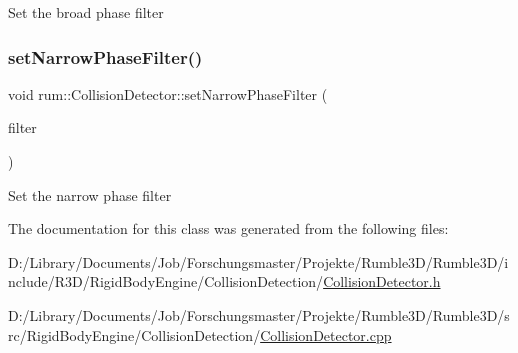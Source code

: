 Set the broad phase filter \mbox{\label{classrum_1_1_collision_detector_ae81fd3b892eb3a03520b6487ae91dedd}} 
\subsubsection{\texorpdfstring{set\+Narrow\+Phase\+Filter()}{setNarrowPhaseFilter()}}
{\footnotesize\ttfamily void rum\+::\+Collision\+Detector\+::set\+Narrow\+Phase\+Filter (\begin{DoxyParamCaption}\item[{\mbox{\hyperlink{classrum_1_1_collision_detector_a8a6d24fed38f8be11b25e43eaabc9638}{Narrow\+Phase\+Filter\+\_\+\+Ptr}}}]{filter }\end{DoxyParamCaption})}

Set the narrow phase filter 

The documentation for this class was generated from the following files\+:\begin{DoxyCompactItemize}
\item 
D\+:/\+Library/\+Documents/\+Job/\+Forschungsmaster/\+Projekte/\+Rumble3\+D/\+Rumble3\+D/include/\+R3\+D/\+Rigid\+Body\+Engine/\+Collision\+Detection/\mbox{\hyperlink{_collision_detector_8h}{Collision\+Detector.\+h}}\item 
D\+:/\+Library/\+Documents/\+Job/\+Forschungsmaster/\+Projekte/\+Rumble3\+D/\+Rumble3\+D/src/\+Rigid\+Body\+Engine/\+Collision\+Detection/\mbox{\hyperlink{_collision_detector_8cpp}{Collision\+Detector.\+cpp}}\end{DoxyCompactItemize}
